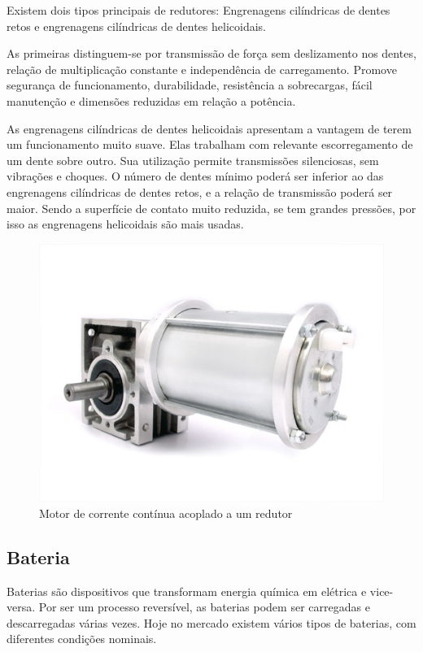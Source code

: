 Existem dois tipos principais de redutores: Engrenagens cilíndricas de dentes retos e engrenagens cilíndricas de dentes helicoidais.

As primeiras distinguem-se por transmissão de força sem deslizamento nos dentes, relação de multiplicação constante e independência de carregamento. Promove segurança de funcionamento, durabilidade, resistência a sobrecargas, fácil manutenção e dimensões reduzidas em relação a potência.

As engrenagens cilíndricas de dentes helicoidais apresentam a vantagem de terem um funcionamento muito suave. Elas trabalham com relevante escorregamento de um dente sobre outro. Sua utilização permite transmissões silenciosas, sem vibrações e choques. O número de dentes mínimo poderá ser inferior ao das engrenagens cilíndricas de dentes retos, e a relação de transmissão poderá ser maior. Sendo a superfície de contato muito reduzida, se tem grandes pressões, por isso as engrenagens helicoidais são mais usadas.

\begin{figure}[!htb]
	\centering
	\includegraphics[keepaspectratio=true,scale=0.5]{figuras/referencialteorico/motor}
	\caption{Motor de corrente contínua acoplado a um redutor}
	\label{fig:motor}
\end{figure}

\subsection{Bateria}

Baterias são dispositivos que transformam energia química em elétrica e vice-versa. Por ser um processo reversível, as baterias podem ser carregadas e descarregadas várias vezes. Hoje no mercado existem vários tipos de baterias, com diferentes condições nominais.

